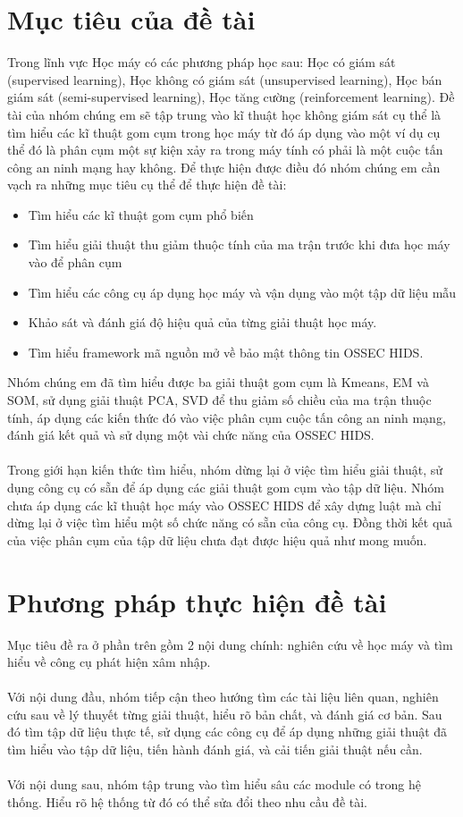 \section{Mục tiêu của đề tài}
Trong lĩnh vực Học máy có các phương pháp học sau: Học có giám sát (supervised
learning), Học không có giám sát (unsupervised learning), Học bán giám sát
(semi-supervised learning), Học tăng cường (reinforcement learning). Đề tài của
nhóm chúng em sẽ tập trung vào kĩ thuật học không giám sát cụ thể là tìm hiểu
các kĩ thuật gom cụm trong học máy từ đó áp dụng vào một ví dụ cụ thể đó là phân
cụm một sự kiện xảy ra trong máy tính có phải là một cuộc tấn công an ninh mạng
hay không. Để thực hiện được điều đó nhóm chúng em cần vạch ra những mục tiêu cụ
thể để thực hiện đề tài:
\begin{itemize}
  \item Tìm hiểu các kĩ thuật gom cụm phổ biến
  \item Tìm hiểu giải thuật thu giảm thuộc tính của ma trận trước khi đưa học
  máy vào để phân cụm
  \item Tìm hiểu các công cụ áp dụng học máy và vận dụng vào một tập dữ liệu mẫu
  \item Khảo sát và đánh giá độ hiệu quả của từng giải thuật học máy.
  \item Tìm hiểu framework mã nguồn mở về bảo mật thông tin OSSEC HIDS.
\end{itemize} 
  Nhóm chúng em đã tìm hiểu được ba giải thuật gom cụm là Kmeans, EM và
SOM, sử dụng giải thuật PCA, SVD để thu giảm số chiều của ma trận thuộc tính, áp
dụng các kiến thức đó vào việc phân cụm cuộc tấn công an ninh mạng, đánh giá kết quả và
sử dụng một vài chức năng của OSSEC HIDS.\\\\ 
Trong giới hạn kiến thức tìm hiểu, nhóm dừng lại ở việc tìm hiểu giải thuật, sử
dụng công cụ có sẵn để áp dụng các giải thuật gom cụm vào tập dữ liệu. Nhóm chưa
áp dụng các kĩ thuật học máy vào OSSEC HIDS để xây dựng luật mà chỉ dừng lại ở
việc tìm hiểu một số chức năng có sẵn của công cụ. Đồng thời kết quả của việc
phân cụm của tập dữ liệu chưa đạt được hiệu quả như mong muốn.
\section{Phương pháp thực hiện đề tài}
Mục tiêu đề ra ở phần trên gồm 2 nội dung chính: nghiên cứu về học máy và tìm
hiểu về công cụ phát hiện xâm nhập.\\\\ 
Với nội dung đầu, nhóm tiếp cận theo hướng tìm các tài liệu liên quan, nghiên
cứu sau về lý thuyết từng giải thuật, hiểu rõ bản chất, và đánh giá cơ bản. Sau
đó tìm tập dữ liệu thực tế, sử dụng các công cụ để áp dụng những giải thuật
đã tìm hiểu vào tập dữ liệu, tiến hành đánh giá, và cải tiến giải thuật nếu
cần.\\\\ 
Với nội dung sau, nhóm tập trung vào tìm hiểu sâu các module có trong hệ thống.
Hiểu rõ hệ thống từ đó có thể sửa đổi theo nhu cầu đề tài.

